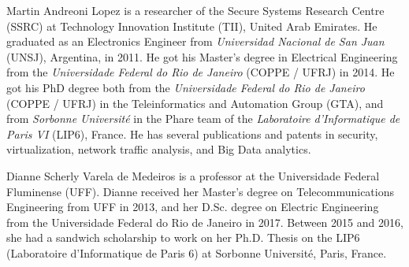\documentclass{ieeeaccess}
\begin{document}
\begin{IEEEbiography}{Martin Andreoni Lopez} is a researcher of the Secure Systems Research Centre (SSRC) at Technology Innovation Institute (TII), United Arab Emirates. He graduated as an Electronics Engineer from \textit{Universidad Nacional de San Juan} (UNSJ), Argentina, in 2011. He got his Master's degree in Electrical Engineering from the \textit{Universidade Federal do Rio de Janeiro} (COPPE / UFRJ) in 2014. He got his PhD degree both from the \textit{Universidade Federal do Rio de Janeiro} (COPPE / UFRJ) in the Teleinformatics and Automation Group (GTA), and from \textit {Sorbonne Université} in the Phare team of the \textit {Laboratoire d'Informatique de Paris VI} (LIP6), France. He has several publications and patents in security, virtualization, network traffic analysis, and Big Data analytics. 
\end{IEEEbiography}

\begin{IEEEbiography}{Dianne Scherly Varela de Medeiros} is a professor at the Universidade Federal Fluminense (UFF). Dianne received her Master’s degree on Telecommunications Engineering from UFF in 2013, and her D.Sc. degree on Electric Engineering from the Universidade Federal do Rio de Janeiro in 2017. Between 2015 and 2016, she had a sandwich scholarship to work on her Ph.D. Thesis on the LIP6 (Laboratoire d’Informatique de Paris 6) at Sorbonne Université, Paris, France.
\end{IEEEbiography}
\end{document}
